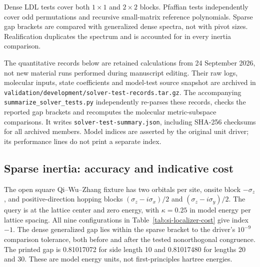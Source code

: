 \documentclass[11pt]{article}
\begin{document}
Dense LDL tests cover both $1\times1$ and $2\times2$ blocks.
Pfaffian tests independently cover odd permutations and recursive
small-matrix reference polynomials.
Sparse gap brackets are compared with generalized dense spectra,
not with pivot sizes. Realification duplicates the spectrum
and is accounted for in every inertia comparison.

The quantitative records below are retained calculations from
24 September 2026, not new material runs performed during manuscript
editing. Their raw logs, molecular inputs, state coefficients and
model-test source snapshot are archived in
\nolinkurl{validation/development/solver-test-records.tar.gz}.
The accompanying \texttt{summarize\_solver\_tests.py} independently
re-parses these records, checks the reported gap brackets and
recomputes the molecular metric-subspace comparisons. It writes
\texttt{solver-test-summary.json}, including SHA-256 checksums for
all archived members. Model indices are asserted by the original
unit driver; its performance lines do not print a separate index.

\subsection{Sparse inertia: accuracy and indicative cost}
The open square Qi--Wu--Zhang fixture has two orbitals per site,
onsite block $-\sigma_z$, and positive-direction hopping blocks
$(\sigma_z-i\sigma_x)/2$ and $(\sigma_z-i\sigma_y)/2$.
The query is at the lattice center and zero energy, with
$\kappa=0.25$ in model energy per lattice spacing.
All nine configurations in Table~\ref{tab:si-localizer-cost} give
index $-1$. The dense generalized gap lies within the sparse
bracket to the driver's $10^{-9}$ comparison tolerance, both before
and after the tested nonorthogonal congruence. The printed gap is
0.81017072 for side length 10 and 0.81017480 for lengths 20 and 30.
These are model energy units, not first-principles hartree energies.
\end{document}

